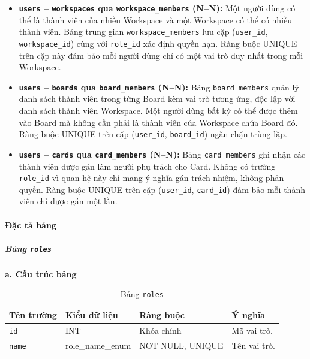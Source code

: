 \begin{itemize}
    \item \textbf{\texttt{users} -- \texttt{workspaces} qua \texttt{workspace\_members} (N--N):} Một người dùng có thể là thành viên của nhiều Workspace và một Workspace có thể có nhiều thành viên. Bảng trung gian \texttt{workspace\_members} lưu cặp (\texttt{user\_id}, \texttt{workspace\_id}) cùng với \texttt{role\_id} xác định quyền hạn. Ràng buộc UNIQUE trên cặp này đảm bảo mỗi người dùng chỉ có một vai trò duy nhất trong mỗi Workspace.
    \item \textbf{\texttt{users} -- \texttt{boards} qua \texttt{board\_members} (N--N):} Bảng \texttt{board\_members} quản lý danh sách thành viên trong từng Board kèm vai trò tương ứng, độc lập với danh sách thành viên Workspace. Một người dùng bất kỳ có thể được thêm vào Board mà không cần phải là thành viên của Workspace chứa Board đó. Ràng buộc UNIQUE trên cặp (\texttt{user\_id}, \texttt{board\_id}) ngăn chặn trùng lặp.
    \item \textbf{\texttt{users} -- \texttt{cards} qua \texttt{card\_members} (N--N):} Bảng \texttt{card\_members} ghi nhận các thành viên được gán làm người phụ trách cho Card. Không có trường \texttt{role\_id} vì quan hệ này chỉ mang ý nghĩa gán trách nhiệm, không phân quyền. Ràng buộc UNIQUE trên cặp (\texttt{user\_id}, \texttt{card\_id}) đảm bảo mỗi thành viên chỉ được gán một lần.
\end{itemize}

\setcounter{secnumdepth}{5}
\paragraph{Đặc tả bảng} \mbox{}

\subparagraph{Bảng \texttt{roles}} \mbox{}

\hspace{1.5em}\textbf{a. Cấu trúc bảng}

\begin{table}[H]
\centering
\begin{tabular}{|p{3cm}|p{3.5cm}|p{3.5cm}|p{4cm}|}
\hline
\textbf{Tên trường} & \textbf{Kiểu dữ liệu} & \textbf{Ràng buộc} & \textbf{Ý nghĩa} \\
\hline
\texttt{id} & INT & Khóa chính & Mã vai trò. \\
\hline
\texttt{name} & role\_name\_enum & NOT NULL, UNIQUE & Tên vai trò. \\
\hline
\end{tabular}
\caption{Bảng \texttt{roles}}
\label{tab:db_roles}
\end{table}

